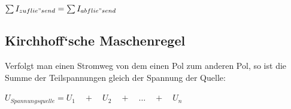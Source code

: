 \documentclass[a4paper]{article}
\begin{document}
\begin{center}
    \Large 
        $\sum{I_{zuflie"send}} = \sum{I_{abflie"send}}$\\[1cm]
    \normalsize
\end{center}


\subsection{Kirchhoff‘sche Maschenregel}
Verfolgt man einen Stromweg von dem einen Pol zum anderen Pol, so ist die Summe der
Teilspannungen gleich der Spannung der Quelle:


\begin{center}
    \Large 
        $U_{Spannungsquelle} = U_1 \quad + \quad U_2 \quad + \quad \dots \quad + \quad U_n$\\[1cm]
    \normalsize
\end{center}
\end{document}
